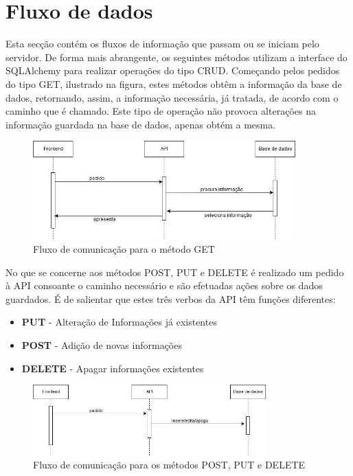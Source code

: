 \section{Fluxo de dados}
Esta secção contém os fluxos de informação que passam ou se iniciam pelo servidor. De forma mais abrangente, os seguintes métodos utilizam a interface do SQLAlchemy para realizar operações do tipo CRUD.\newline
Começando pelos pedidos do tipo GET, ilustrado na figura, estes métodos obtêm a informação da base de dados, retornando, assim, a informação necessária, já tratada, de acordo com o caminho que é chamado.
Este tipo de operação não provoca alterações na informação guardada na base de dados, apenas obtém a mesma.
\begin{figure}[!ht]
    \centering
    \includegraphics[width=0.9\textwidth]{images/fluxo1.jpg}
    \caption{Fluxo de comunicação para o método GET}
    \label{fig:get}
\end{figure}
\hfill\break
No que se concerne aos métodos POST, PUT e DELETE é realizado um pedido à API consoante o caminho necessário e são efetuadas ações sobre os dados guardados. É de salientar que estes três verbos da API têm funções diferentes:
\begin{itemize}[noitemsep]
    \item \textbf{PUT} - Alteração de Informações já existentes
    \item \textbf{POST} - Adição de novas informações
    \item \textbf{DELETE} - Apagar informações existentes
\end{itemize}
\begin{figure}[!ht]
    \centering
    \includegraphics[width=0.8\textwidth]{images/fluxo2.jpg}
    \caption{Fluxo de comunicação para os métodos POST, PUT e DELETE}
    \label{fig:post}
\end{figure}
